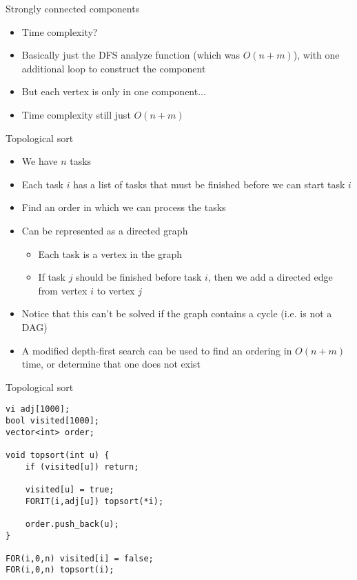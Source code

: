 \documentclass[12pt,t]{beamer}
\newcommand{\bi}{\begin{itemize}}
\newcommand{\ei}{\end{itemize}}
\begin{document}
\begin{frame}{Strongly connected components}
    \vspace{30pt}
    \bi
        \item Time complexity?
        \item Basically just the DFS analyze function (which was $O(n + m)$), with one additional loop to construct the component
        \item But each vertex is only in one component...
        \item Time complexity still just $O(n + m)$
    \ei
\end{frame}


\begin{frame}{Topological sort}
    \vspace{5pt}
    \bi
        \item We have $n$ tasks
        \item Each task $i$ has a list of tasks that must be finished before we can start task $i$
        \item Find an order in which we can process the tasks
        \vspace{5pt}
        \item Can be represented as a directed graph
            \bi
                \item Each task is a vertex in the graph
                \item If task $j$ should be finished before task $i$, then we add a directed edge from vertex $i$ to vertex $j$
            \ei
        \vspace{5pt}
        \item Notice that this can't be solved if the graph contains a cycle (i.e. is not a DAG)
        \vspace{5pt}
        \item A modified depth-first search can be used to find an ordering in $O(n + m)$ time, or determine that one does not exist
    \ei
\end{frame}

\begin{frame}[fragile]{Topological sort}
    \begin{verbatim}
vi adj[1000];
bool visited[1000];
vector<int> order;

void topsort(int u) {
    if (visited[u]) return;

    visited[u] = true;
    FORIT(i,adj[u]) topsort(*i);

    order.push_back(u);
}

FOR(i,0,n) visited[i] = false;
FOR(i,0,n) topsort(i);
    \end{verbatim}
\end{frame}
\end{document}
